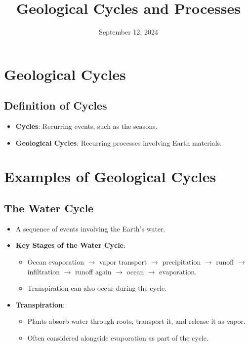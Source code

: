 \documentclass[12pt]{article}
\title{Geological Cycles and Processes}
\author{}
\date{September 12, 2024}
\begin{document}
\maketitle

\section*{Geological Cycles}
\subsection*{Definition of Cycles}
\begin{itemize}
    \item \textbf{Cycles}: Recurring events, such as the seasons.
    \item \textbf{Geological Cycles}: Recurring processes involving Earth materials.
\end{itemize}

\section*{Examples of Geological Cycles}
\subsection*{The Water Cycle}
\begin{itemize}
    \item A sequence of events involving the Earth's water.
    \item \textbf{Key Stages of the Water Cycle}:
    \begin{itemize}
        \item Ocean evaporation $\rightarrow$ vapor transport $\rightarrow$ precipitation $\rightarrow$ runoff $\rightarrow$ infiltration $\rightarrow$ runoff again $\rightarrow$ ocean $\rightarrow$ evaporation.
        \item Transpiration can also occur during the cycle.
    \end{itemize}
    \item \textbf{Transpiration}:
    \begin{itemize}
        \item Plants absorb water through roots, transport it, and release it as vapor.
        \item Often considered alongside evaporation as part of the cycle.
    \end{itemize}
\end{itemize}
\end{document}
